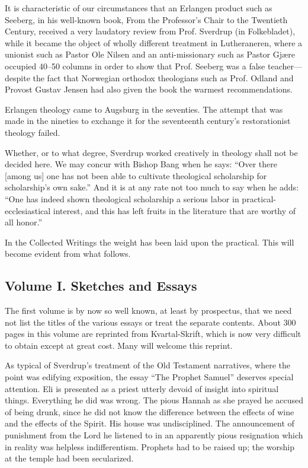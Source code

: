 It is characteristic of our circumstances that an Erlangen product such as Seeberg, in his well-known book, From the Professor’s Chair to the Twentieth Century, received a very laudatory review from Prof. Sverdrup (in Folkebladet), while it became the object of wholly different treatment in Lutheraneren, where a unionist such as Pastor Ole Nilsen and an anti-missionary such as Pastor Gjære occupied 40–50 columns in order to show that Prof. Seeberg was a false teacher—despite the fact that Norwegian orthodox theologians such as Prof. Odland and Provost Gustav Jensen had also given the book the warmest recommendations.

Erlangen theology came to Augsburg in the seventies. The attempt that was made in the nineties to exchange it for the seventeenth century’s restorationist theology failed.

Whether, or to what degree, Sverdrup worked creatively in theology shall not be decided here. We may concur with Bishop Bang when he says: “Over there [among us] one has not been able to cultivate theological scholarship for scholarship’s own sake.” And it is at any rate not too much to say when he adds: “One has indeed shown theological scholarship a serious labor in practical-ecclesiastical interest, and this has left fruits in the literature that are worthy of all honor.”

In the Collected Writings the weight has been laid upon the practical. This will become evident from what follows.

\subsection{Volume I. Sketches and Essays}

The first volume is by now so well known, at least by prospectus, that we need not list the titles of the various essays or treat the separate contents. About 300 pages in this volume are reprinted from Kvartal-Skrift, which is now very difficult to obtain except at great cost. Many will welcome this reprint.

As typical of Sverdrup’s treatment of the Old Testament narratives, where the point was edifying exposition, the essay “The Prophet Samuel” deserves special attention. Eli is presented as a priest utterly devoid of insight into spiritual things. Everything he did was wrong. The pious Hannah as she prayed he accused of being drunk, since he did not know the difference between the effects of wine and the effects of the Spirit. His house was undisciplined. The announcement of punishment from the Lord he listened to in an apparently pious resignation which in reality was helpless indifferentism. Prophets had to be raised up; the worship at the temple had been secularized.

